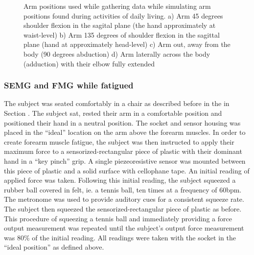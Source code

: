 \documentclass[twocolumn]{sagej}
\begin{document}
\begin{figure}[htbp]
\centering
{}
\caption{Arm positions used while gathering data while simulating arm positions found during activities of daily living. a) Arm 45 degrees shoulder flexion in the sagital plane (the hand approximately at waist-level) b) Arm 135 degrees of shoulder flexion in the sagittal plane (hand at approximately head-level) c) Arm out, away from the body (90 degrees abduction) d) Arm laterally across the body (adduction) with their elbow fully extended}

\end{figure}

\subsubsection*{SEMG and FMG while fatigued}
\label{sec:exp_prot-fatigued}

The subject was seated comfortably in a chair as described before in the in Section \textit{}.  The subject sat, rested their arm in a comfortable position and positioned their hand in a neutral position.  The socket and sensor housing was placed in the ``ideal'' location on the arm above the forearm muscles. In order to create forearm muscle fatigue, the subject was then instructed to apply their maximum force to a sensorized-rectangular piece of plastic with their dominant hand in a ``key pinch'' grip.  A single piezeoresistive sensor was mounted between this piece of plastic and a solid surface with cellophane tape.  An initial reading of applied force was taken.  Following this initial reading, the subject squeezed a rubber ball covered in felt, ie. a tennis ball, ten times at a frequency of 60bpm. The metronome was used to provide auditory cues for a consistent squeeze rate.  The subject then squeezed the sensorized-rectangular piece of plastic as before.  This procedure of squeezing a tennis ball and immediately providing a force output measurement was repeated until the subject's output force measurement was 80\% of the initial reading.  All readings were taken with the socket in the ``ideal position'' as defined above.\par \noindent
\end{document}
